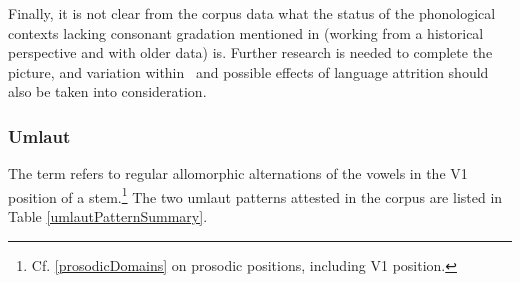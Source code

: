 Finally, it is not clear from the corpus data what the status of the phonological contexts lacking consonant gradation mentioned in \citet[21]{Sammallahti1998} (working from a historical perspective and with older data) is. Further research is needed to complete the picture, and %
variation within \PS\ and possible effects of language attrition should also be taken into consideration.



\subsubsection{Umlaut}\label{umlaut}
The term  refers to regular allomorphic alternations of the vowels in the V1 position of a stem.\footnote{Cf. \SEC\ref{prosodicDomains} on prosodic positions, including V1 position.} 
The two umlaut patterns attested in the corpus are listed in Table \vref{umlautPatternSummary}. %
